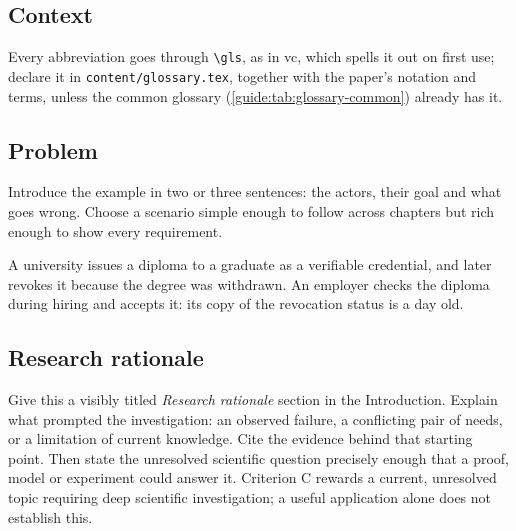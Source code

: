 \subsection{Context}\label{guide:chapters:context}
Every abbreviation goes through \texttt{\textbackslash gls}, as in \gls{vc}, which spells it out on first use; declare it in \texttt{content/glossary.tex}, together with the paper's notation and terms, unless the common glossary (\cref{guide:tab:glossary-common}) already has it.

\subsection[Problem]{Problem\skimmark}\label{guide:chapters:problem}
Introduce the example in two or three sentences: the actors, their goal and what goes wrong. Choose a scenario simple enough to follow across chapters but rich enough to show every requirement.
\begin{runningexample}
A university issues a diploma to a graduate as a verifiable credential, and later revokes it because the degree was withdrawn. An employer checks the diploma during hiring and accepts it: its copy of the revocation status is a day old.
\end{runningexample}

\subsection{Research rationale}\label{guide:chapters:rationale}
Give this a visibly titled \emph{Research rationale} section in the Introduction. Explain what prompted the investigation: an observed failure, a conflicting pair of needs, or a limitation of current knowledge. Cite the evidence behind that starting point. Then state the unresolved scientific question precisely enough that a proof, model or experiment could answer it. Criterion C rewards a current, unresolved topic requiring deep scientific investigation; a useful application alone does not establish this.

